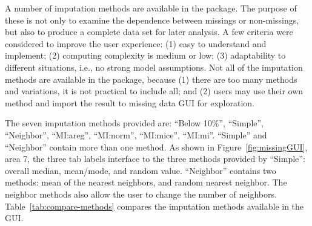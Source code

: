 \documentclass[article]{jss}
\begin{document}
A number of imputation methods are available in the package. The purpose of these is not only to examine the dependence between missings or non-missings, but also to produce a complete data set for later analysis. A few criteria were considered to improve the user experience: (1) easy to understand and implement; (2) computing complexity is medium or low; (3) adaptability to different situations, i.e., no strong model assumptions. Not all of the imputation methods are available in the package, because (1) there are too many methods and variations, it is not practical to include all; and (2) users may use their own method and import the result to missing data GUI for exploration.

The seven imputation methods provided are: 
``Below 10\%'', ``Simple'', ``Neighbor'', ``MI:areg'', ``MI:norm'', ``MI:mice'', ``MI:mi''. 
``Simple'' and ``Neighbor'' contain more than one method. As shown in Figure~\ref{fig:missingGUI}, area 7, the three tab labels interface to the three methods provided by ``Simple'': overall median, mean/mode, and random value. ``Neighbor'' contains two methods: mean of the nearest neighbors, and random nearest neighbor. The neighbor methods also allow the user to change the number of neighbors. Table~\ref{tab:compare-methods} compares the imputation methods available in the GUI.
\end{document}
